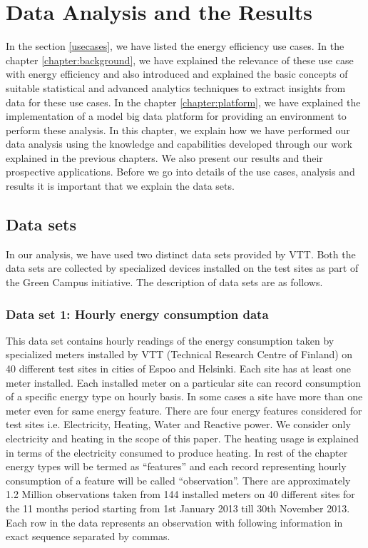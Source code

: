 \chapter{Data Analysis and the Results}
\label{chapter:Analysis}

In the section \ref{usecases}, we have listed the energy efficiency use cases. In the chapter \ref{chapter:background}, we have explained the relevance of these use case with energy efficiency and also introduced and explained the basic concepts of suitable statistical and advanced analytics techniques to extract insights from data for these use cases. In the chapter \ref{chapter:platform}, we have explained the implementation of a model big data platform for providing an environment to perform these analysis. In this chapter, we explain how we have performed our data analysis using the knowledge and capabilities developed through our work explained in the previous chapters. We also present our results and their prospective applications. Before we go into details of the use cases, analysis and results it is important that we explain the data sets.

\section{Data sets} \label{datasets}
In our analysis, we have used two distinct data sets provided by VTT. Both the data sets are collected by specialized devices installed on the test sites as part of the Green Campus initiative. The description of data sets are as follows.

\subsection{Data set 1: Hourly energy consumption data}
This data set contains hourly readings of the energy consumption taken by specialized meters installed by VTT (Technical Research Centre of Finland) on 40 different test sites in cities of Espoo and Helsinki. Each site has at least one meter installed. Each installed meter on a particular site can record consumption of a specific energy type on hourly basis. In some cases a site have more than one meter even for same energy feature. There are four energy features considered for test sites i.e. Electricity, Heating, Water and Reactive power. We consider only electricity and heating in the scope of this paper. The heating usage is explained in terms of the electricity consumed to produce heating.  In rest of the chapter energy types will be termed as ``features'' and each record representing hourly consumption of a feature will be called ``observation''.
There are approximately 1.2 Million observations taken from 144 installed meters on 40 different sites for the 11 months period starting from 1st January 2013 till 30th November 2013.  Each row in the data represents an observation with following information in exact sequence separated by commas. 

